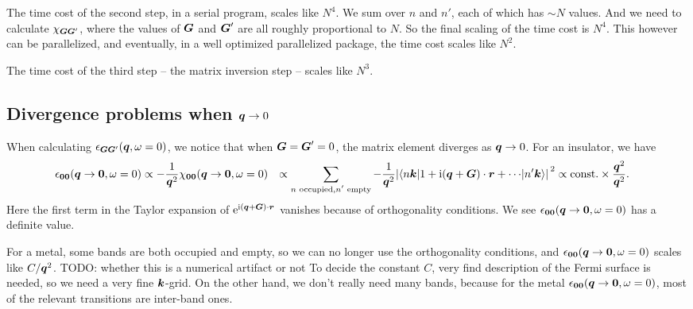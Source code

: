 \documentclass[hyperref, a4paper, 12pt]{report}
\newcommand*{\ii}{\mathrm{i}}
\newcommand*{\ee}{\mathrm{e}}
\newcommand*{\const}{\mathrm{const}}
\def\\{}%
\begin{document}
The time cost of the second step, 
in a serial program, scales like $N^4$.
We sum over $n$ and $n'$,
each of which has $\sim N$ values.
And we need to calculate $\chi_{\vb*{G} \vb*{G}'}$,
where the values of $\vb*{G}$ and $\vb*{G}'$ are all roughly proportional to $N$.
So the final scaling of the time cost is $N^4$.
This however can be parallelized,
and eventually, in a well optimized parallelized package,
the time cost scales like $N^2$.

The time cost of the third step -- the matrix inversion step -- 
scales like $N^3$.

\subsection{Divergence problems when $\vb*{q} \to 0$}

When calculating $\epsilon_{\vb*{G} \vb*{G}'}(\vb*{q}, \omega = 0)$,
we notice that when $\vb*{G} = \vb*{G}' = 0$,
the matrix element diverges as $\vb*{q} \to 0$.
For an insulator, we have 
\begin{equation}
    \begin{aligned}
        \epsilon_{\vb*{0} \vb*{0}} (\vb*{q} \to \vb*{0}, \omega = 0)
        &\propto - \frac{1}{\vb*{q}^2} \chi_{\vb*{0} \vb*{0}} (\vb*{q} \to \vb*{0}, \omega = 0) \\
        &\propto \sum_{\text{$n$ occupied}, \text{$n'$ empty}} - \frac{1}{\vb*{q}^2} 
        \abs*{
            \mel**{n \vb*{k}}{1 + \ii (\vb*{q} + \vb*{G}) \cdot \vb*{r} + \cdots }{n' \vb*{k}}
        }^2 \\
        &\propto \const. \times \frac{\vb*{q}^2}{\vb*{q}^2}.
    \end{aligned}
\end{equation}
Here the first term in the Taylor expansion of $\ee^{\ii (\vb*{q} + \vb*{G}) \cdot \vb*{r}}$ vanishes
because of orthogonality conditions.
We see $\epsilon_{\vb*{0} \vb*{0}} (\vb*{q} \to \vb*{0}, \omega = 0)$
has a definite value.

For a metal, some bands are both occupied and empty,
so we can no longer use the orthogonality conditions,
and $\epsilon_{\vb*{0} \vb*{0}} (\vb*{q} \to \vb*{0}, \omega = 0)$ 
scales like $C / \vb*{q}^2$.
TODO: whether this is a numerical artifact or not 
To decide the constant $C$,
very find description of the Fermi surface is needed,
so we need a very fine $\vb*{k}$-grid.
On the other hand, 
we don't really need many bands,
because for the metal $\epsilon_{\vb*{0} \vb*{0}} (\vb*{q} \to \vb*{0}, \omega = 0)$,
most of the relevant transitions are inter-band ones.
\end{document}
